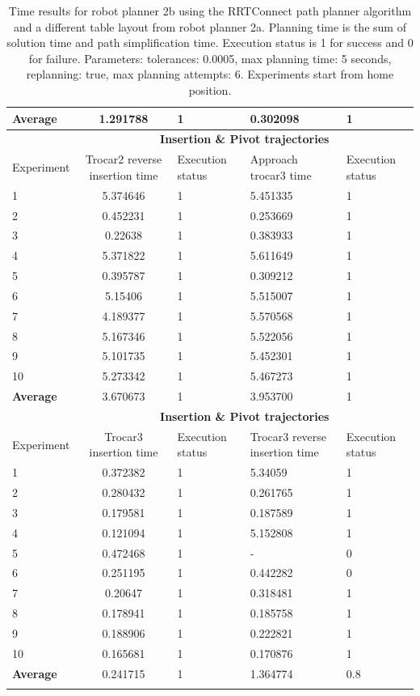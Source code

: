 \begin{longtable}{|p{2cm}|c|p{2cm}|p{2cm}|p{2cm}|}
\hline
\textbf{Average} & 1.291788	& 1	& 0.302098	& 1 \\
\hline
                          & \multicolumn{4}{c}{\textbf{Insertion \& Pivot trajectories}}                     \vline \\
\hline
Experiment                & Trocar2 reverse insertion time & Execution status & Approach trocar3 time & Execution status  \\
\hline
1 & 5.374646	& 1	& 5.451335	& 1 \\
2 & 0.452231	& 1	& 0.253669	& 1 \\
3 & 0.22638	& 1	& 0.383933	& 1 \\
4 & 5.371822	& 1	& 5.611649	& 1 \\
5 & 0.395787	& 1	& 0.309212	& 1 \\
6 & 5.15406	& 1	& 5.515007	& 1 \\
7 & 4.189377	& 1	& 5.570568	& 1 \\
8 & 5.167346	& 1	& 5.522056	& 1 \\
9 & 5.101735	& 1	& 5.452301	& 1 \\
10  & 5.273342	& 1	& 5.467273	& 1 \\
\hline
\textbf{Average} & 3.670673	& 1	& 3.953700	& 1 \\
\hline
                          & \multicolumn{4}{c}{\textbf{Insertion \& Pivot trajectories}}                     \vline \\
\hline
Experiment                & Trocar3 insertion time & Execution status & Trocar3 reverse insertion time & Execution status  \\
\hline
1 & 0.372382	& 1	& 5.34059	& 1 \\
2 & 0.280432	& 1	& 0.261765	& 1 \\
3 & 0.179581	& 1	& 0.187589	& 1 \\
4 & 0.121094	& 1	& 5.152808	& 1 \\
5 & 0.472468	& 1	& -	& 0 \\
6 & 0.251195	& 1	& 0.442282	& 0 \\
7 & 0.20647	& 1	& 0.318481	& 1 \\
8 & 0.178941	& 1	& 0.185758	& 1 \\
9 & 0.188906	& 1	& 0.222821	& 1 \\
10  & 0.165681	& 1	& 0.170876	& 1 \\
\hline
\textbf{Average} & 	0.241715  &	1 &	1.364774 &	0.8 \\
\hline
\caption{Time results for robot planner 2b using the RRTConnect path planner algorithm and a different table layout from robot planner 2a. Planning time is the sum of solution time and path simplification time. Execution status is 
1 for success and 0 for failure. Parameters: tolerances: 0.0005, max planning time: 5 seconds, replanning: true, max planning attempts: 6. Experiments start from home position.}
\label{robot-planner2b-rrtconnect-data}
\end{longtable}


